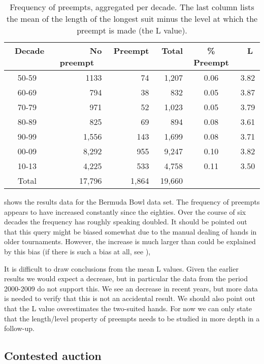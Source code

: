 \documentclass{llncs}
\begin{document}
\begin{table}
\caption{Frequency of preempts, aggregated per decade. The last column
lists the mean of the length of the longest suit minus the level at
which the preempt is made (the L value).}
\centering
\label{tbl:preempt}
\begin{tabular}{|c|r|r|r|c|c|}
\hline
\bf \ Decade \ & \bf \ No preempt \ & \bf Preempt \ & \bf Total  \ & 
\bf \% Preempt & \bf \ L \  \\ 
\hline\hline
50-59 & 1133 & 74 & 1,207 & 0.06 & 3.82 \\ \hline
60-69 & 794  & 38 & 832& 0.05 & 3.87 \\ \hline
70-79 & 971  & 52 & 1,023 & 0.05 & 3.79 \\ \hline
80-89 & 825 & 69 & 894 & 0.08 & 3.61 \\ \hline
90-99 & 1,556 & 143 & 1,699 & 0.08 & 3.71 \\ \hline
00-09 & 8,292 & 955 & 9,247 & 0.10 & 3.82 \\ \hline
10-13 & 4,225 & 533 & 4,758 & 0.11 & 3.50 \\ \hline
\hline
Total  & 17,796 & 1,864 & 19,660 &  & \\ 
\hline
\end{tabular}
\end{table}

 shows the results data for the Bermuda Bowl data
set. The frequency of preempts appears to have increased constantly
since the eighties. Over the course of six decades the frequency has
roughly speaking doubled. It should be pointed out that this query
might be biased somewhat due to the manual dealing of hands in older
tournaments. However, the increase is much larger than could be
explained by this bias (if there is such a bias at all, see
), 

It is difficult to draw conclusions from the mean L values. Given the
earlier results we would expect a decrease, but in particular the
data from the period 2000-2009 do not support this. 
We see an decrease in recent years, but more data is
needed to verify that this is not an accidental result. 
We should also point out that the L value overestimates the two-suited
hands.  For now we can only state that the length/level 
property of preempts needs to be studied in more depth in a follow-up.  

\subsection{Contested auction}
\end{document}
